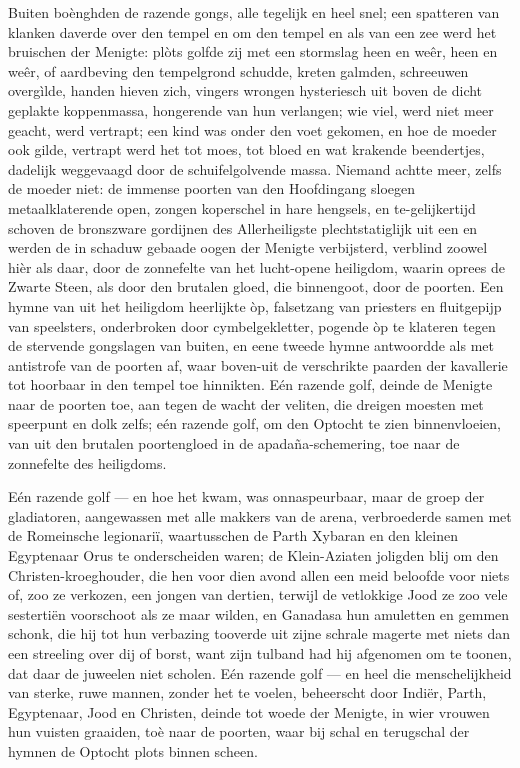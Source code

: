 \documentclass[a4paper, 12pt, oneside, dutch]{article}
\begin{document}
Buiten boènghden de razende gongs, alle tegelijk en heel snel; een spatteren van klanken daverde over den tempel en om den tempel en als van een zee werd het bruischen der Menigte: plòts golfde zij met een stormslag heen en weêr, heen en weêr, of aardbeving den tempelgrond schudde, kreten galmden, schreeuwen overgìlde, handen hieven zich, vingers wrongen hysteriesch uit boven de dicht geplakte koppenmassa, hongerende van hun verlangen; wie viel, werd niet meer geacht, werd vertrapt; een kind was onder den voet gekomen, en hoe de moeder ook gilde, vertrapt werd het tot moes, tot bloed en wat krakende beendertjes, dadelijk weggevaagd door de schuifelgolvende massa. Niemand achtte meer, zelfs de moeder niet: de immense poorten van den Hoofdingang sloegen metaalklaterende open, zongen koperschel in hare hengsels, en te-gelijkertijd schoven de bronszware gordijnen des Allerheiligste plechtstatiglijk uit een en werden de in schaduw gebaade oogen der Menigte verbijsterd, verblind zoowel hièr als daar, door de zonnefelte van het lucht-opene heiligdom, waarin oprees de Zwarte Steen, als door den brutalen gloed, die binnengoot, door de poorten. Een hymne van uit het heiligdom heerlijkte òp, falsetzang van priesters en fluitgepijp van speelsters, onderbroken door cymbelgekletter, pogende òp te klateren tegen de stervende gongslagen van buiten, en eene tweede hymne antwoordde als met antistrofe van de poorten af, waar boven-uit de verschrikte paarden der kavallerie tot hoorbaar in den tempel toe hinnikten. Eén razende golf, deinde de Menigte naar de poorten toe, aan tegen de wacht der veliten, die dreigen moesten met speerpunt en dolk zelfs; eén razende golf, om den Optocht te zien binnenvloeien, van uit den brutalen poortengloed in de apadaña-schemering, toe naar de zonnefelte des heiligdoms.

Eén razende golf --- en hoe het kwam, was onnaspeurbaar, maar de groep der gladiatoren, aangewassen met alle makkers van de arena, verbroederde samen met de Romeinsche legionariï, waartusschen de Parth Xybaran en den kleinen Egyptenaar Orus te onderscheiden waren; de Klein-Aziaten joligden blij om den Christen-kroeghouder, die hen voor dien avond allen een meid beloofde voor niets of, zoo ze verkozen, een jongen van dertien, terwijl de vetlokkige Jood ze zoo vele sestertiën voorschoot als ze maar wilden, en Ganadasa hun amuletten en gemmen schonk, die hij tot hun verbazing tooverde uit zijne schrale magerte met niets dan een streeling over dij of borst, want zijn tulband had hij afgenomen om te toonen, dat daar de juweelen niet scholen. Eén razende golf --- en heel die menschelijkheid van sterke, ruwe mannen, zonder het te voelen, beheerscht door Indiër, Parth, Egyptenaar, Jood en Christen, deinde tot woede der Menigte, in wier vrouwen hun vuisten graaiden, toè naar de poorten, waar bij schal en terugschal der hymnen de Optocht plots binnen scheen.
\end{document}

